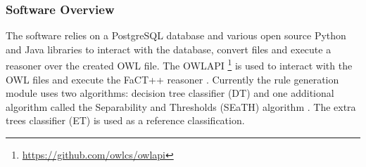 \documentclass[authoryear, review,12pt,number]{elsarticle}
\begin{document}
\subsubsection{Software Overview}
The software relies on a PostgreSQL database and various open source Python and
Java libraries to interact with the database, convert files and execute a
reasoner over the created OWL file.  The OWLAPI
\footnote{\url{https://github.com/owlcs/owlapi}} is used to interact with the
OWL files and execute the FaCT++ reasoner \citep{Tsarkov2006}. Currently the
rule generation module uses two algorithms: decision tree classifier (DT) and
one additional algorithm called the Separability and Thresholds (SEaTH)
algorithm \citep{Nussbaum2006}. The extra trees classifier (ET) is used 
as a reference classification.

\end{document}
